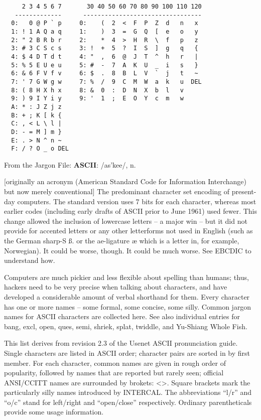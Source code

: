 \documentclass[10pt,twoside,openright]{memoir}
\begin{document}
{\footnotesize
\begin{verbatim}
     2 3 4 5 6 7       30 40 50 60 70 80 90 100 110 120
   -------------      ---------------------------------
  0:   0 @ P ` p     0:    (  2  <  F  P  Z  d   n   x
  1: ! 1 A Q a q     1:    )  3  =  G  Q  [  e   o   y
  2: " 2 B R b r     2:    *  4  >  H  R  \  f   p   z
  3: # 3 C S c s     3: !  +  5  ?  I  S  ]  g   q   {
  4: $ 4 D T d t     4: "  ,  6  @  J  T  ^  h   r   |
  5: % 5 E U e u     5: #  -  7  A  K  U  _  i   s   }
  6: & 6 F V f v     6: $  .  8  B  L  V  `  j   t   ~
  7: ' 7 G W g w     7: %  /  9  C  M  W  a  k   u  DEL
  8: ( 8 H X h x     8: &  0  :  D  N  X  b  l   v
  9: ) 9 I Y i y     9: '  1  ;  E  O  Y  c  m   w
  A: * : J Z j z
  B: + ; K [ k {
  C: , < L \ l |
  D: - = M ] m }
  E: . > N ^ n ~
  F: / ? O _ o DEL  
\end{verbatim}
}

\noindent From the Jargon File: \textbf{ASCII}: /as'kee/, n.

[originally an acronym (American Standard Code for Information Interchange) but now merely conventional] The predominant character set encoding of present-day computers. The standard version uses 7 bits for each character, whereas most earlier codes (including early drafts of ASCII prior to June 1961) used fewer. This change allowed the inclusion of lowercase letters -- a major win -- but it did not provide for accented letters or any other letterforms not used in English (such as the German sharp-S {\ss}. or the ae-ligature {\ae} which is a letter in, for example, Norwegian). It could be worse, though. It could be much worse. See EBCDIC to understand how.

Computers are much pickier and less flexible about spelling than humans; thus, hackers need to be very precise when talking about characters, and have developed a considerable amount of verbal shorthand for them. Every character has one or more names -- some formal, some concise, some silly. Common jargon names for ASCII characters are collected here. See also individual entries for bang, excl, open, ques, semi, shriek, splat, twiddle, and Yu-Shiang Whole Fish.

This list derives from revision 2.3 of the Usenet ASCII pronunciation guide. Single characters are listed in ASCII order; character pairs are sorted in by first member. For each character, common names are given in rough order of popularity, followed by names that are reported but rarely seen; official ANSI/CCITT names are surrounded by brokets: <>. Square brackets mark the particularly silly names introduced by INTERCAL. The abbreviations ``l/r'' and ``o/c'' stand for left/right and ``open/close'' respectively. Ordinary parentheticals provide some usage information.
\end{document}
